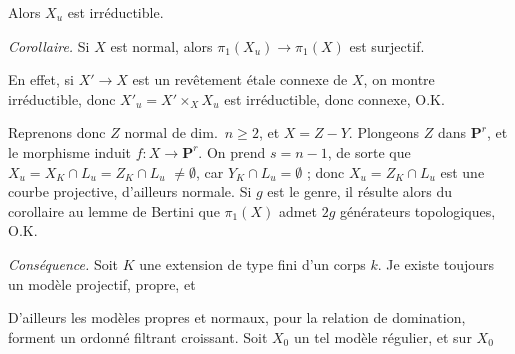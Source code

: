 \documentclass[11pt,a4paper]{article}
\begin{document}

Alors $X_u$ est irréductible.

\emph{Corollaire.}  Si $X$ est normal, alors
$\pi_1(X_u) \to \pi_1(X)$ est surjectif.


En effet, si $X' \to X$ est un revêtement  étale connexe de
$X$, \ill{} on montre \ill{} irréductible, donc
$X'_u = X' \times_X X_u$ est irréductible, donc connexe, O.K.

\marginal{\ill{}}

Reprenons donc $Z$ normal de dim.\ $n \geq 2$, et $X = Z - Y$. Plongeons $Z$
dans $\mathbf{P}^r$, et le morphisme induit $f : X \to \mathbf{P}^r$. On
prend $s = n-1$, de sorte que
$X_u = X_K \cap L_u = Z_K \cap L_u$  $\neq \emptyset$,
car $Y_K \cap L_u = \emptyset$ ; donc $X_u = Z_K \cap L_u$ est une courbe
\struck{\ill{}} projective, d'ailleurs normale. Si $g$ est le genre, il
résulte alors du corollaire au lemme de Bertini que $\pi_1(X)$ admet $2g$
générateurs topologiques, O.K.

\emph{Conséquence.} Soit $K$ une extension de type fini d'un corps $k$. Je
\ill{} existe toujours un modèle projectif,  
\ill{} propre, et \ill{} \struck{\ill{}}




D'ailleurs les modèles propres et normaux, pour la relation de domination,
forment un ordonné filtrant croissant. \struck{\ill{}} Soit $X_0$ un tel
modèle \ill{}  \ill{} régulier, et sur $X_0$ \ill{}
\struck{\ill{}}
\end{document}
